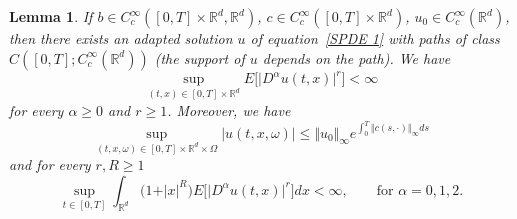 \documentclass[a4paper,10pt]{article}
\newtheorem{lemma}[theorem]{Lemma}
\begin{document}
\begin{lemma}
\label{lemma preliminare sul caso smooth}If $b\in C_{c}^{\infty}([0,T] \times\mathbb{R}^{d},\mathbb{R}^{d})$, $c\in C_{c}^{\infty}([0,T] \times \mathbb{R}^{d})$, $u_{0} \in C_{c}^{\infty}(\mathbb{R}^{d})$, then there exists an adapted solution $u$ of equation~\eqref{SPDE 1} with paths of class $C([0,T];C_{c}^{\infty}(\mathbb{R}^{d}))$ (the support of $u$ depends on the path). We have
\begin{equation}
\sup_{(t,x) \in [0,T] \times \mathbb{R}^{d}}E \big[ \vert D^{\alpha}u(t,x) \vert^{r}\big]
<\infty \label{ineq 1 lemma smooth}
\end{equation}
for every $\alpha\geq0$ and $r\geq1$. Moreover, we have
\begin{equation}
\sup_{(t,x,\omega)  \in [0,T] \times \mathbb{R}^{d} \times \Omega} \vert u(t,x,\omega) \vert
\leq \Vert u_{0} \Vert_{\infty} e^{\int_{0}^{T}\Vert c (s,\cdot) \Vert_{\infty} ds} \label{ineq 2 lemma smooth}
\end{equation}
and for every $r,R\geq1$
\begin{equation}
\sup_{t\in [0,T]} \int_{\mathbb{R}^{d}} \big(1+\vert x \vert^{R} \big)  E \big[\vert D^{\alpha} u(t,x) \vert^{r} \big]  dx < \infty,\qquad \text{for }\alpha=0,1,2. 
\label{ineq 3 lemma smooth}
\end{equation}
\end{lemma}
\end{document}
